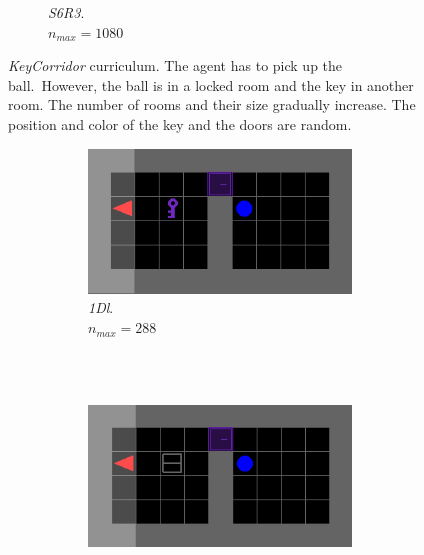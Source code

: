 \documentclass{article}
\begin{document}
\begin{figure}[H]
\begin{subfigure}[b]{0.32\linewidth}
    \caption{\textit{S6R3}. \\
    \(n_{max}=1080\)}
  \end{subfigure}
  \caption{\textit{KeyCorridor} curriculum. The agent has to pick up the ball.\ However, the ball is in a locked room and the key in another room. The number of rooms and their size gradually increase. The position and color of the key and the doors are random.}
\label{fig:keycorridor}
\end{figure}

\begin{figure}[H]
  \begin{subfigure}[b]{0.3\linewidth}
  \begin{subfigure}[b]{\linewidth}
    \centering
    \includegraphics[width=\linewidth]{Tasks/ObstructedMaze/1Dl}
    \caption{\textit{1Dl}.
    \\ \(n_{max}=288 \)}
  \end{subfigure} \\\\
  \begin{subfigure}[b]{\linewidth}
    \centering
    \includegraphics[width=\linewidth]{Tasks/ObstructedMaze/1Dlh}

\end{subfigure}
\end{subfigure}
\end{figure}
\end{document}
